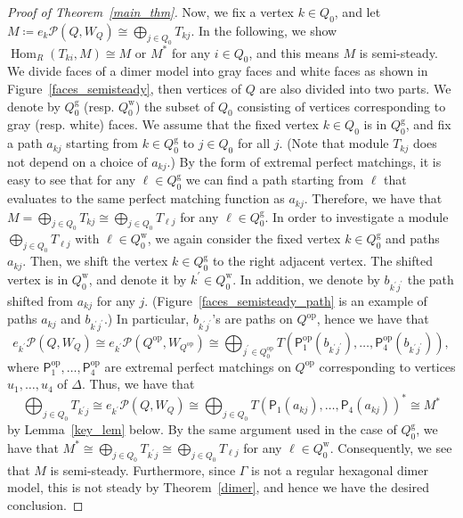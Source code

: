 \documentclass[11pt]{amsart}
\theoremstyle{definition}
\newcommand{\rmg}{\mathrm{g}}
\newcommand{\rmw}{\mathrm{w}}
\newcommand{\calP}{\mathcal{P}}
\newcommand{\sfP}{\mathsf{P}}
\DeclareMathOperator{\op}{op}
\DeclareMathOperator{\Hom}{Hom}
\begin{document}
\begin{proof}[Proof of Theorem~\ref{main_thm}]
Now, we fix a vertex $k\in Q_0$, and let $M\coloneqq e_k\calP(Q, W_Q)\cong\bigoplus_{j\in Q_0}T_{kj}$. In the following, we show $\Hom_R(T_{ki},M)\cong M$ or $M^*$ for any $i\in Q_0$, and this means $M$ is semi-steady. We divide faces of a dimer model into gray faces and white faces as shown in Figure~\ref{faces_semisteady}, then vertices of $Q$ are also divided into two parts. We denote by $Q_0^{\rmg}$ (resp. $Q_0^{\rmw}$) the subset of $Q_0$ consisting of vertices corresponding to gray (resp. white) faces. We assume that the fixed vertex $k\in Q_0$ is in $Q_0^{\rmg}$, and fix a path $a_{kj}$ starting from $k\in Q_0^{\rmg}$ to $j\in Q_0$ for all $j$. (Note that module $T_{kj}$ does not depend on a choice of $a_{kj}$.) By the form of extremal perfect matchings, it is easy to see that for any $\ell\in Q_0^{\rmg}$ we can find a path starting from $\ell$ that evaluates to the same perfect matching function as $a_{kj}$. Therefore, we have that $M=\bigoplus_{j\in Q_0}T_{kj}\cong\bigoplus_{j\in Q_0}T_{\ell j}$ for any $\ell\in Q_0^{\rmg}$. In order to investigate a module $\bigoplus_{j\in Q_0}T_{\ell j}$ with $\ell\in Q_0^{\rmw}$, we again consider the fixed vertex $k\in Q_0^{\rmg}$ and paths $a_{kj}$. Then, we shift the vertex $k\in Q_0^{\rmg}$ to the right adjacent vertex. The shifted vertex is in $Q_0^{\rmw}$, and denote it by $k^\prime\in Q_0^{\rmw}$. In addition, we denote by $b_{k^\prime j^\prime}$ the path shifted from $a_{kj}$ for any $j$. (Figure~\ref{faces_semisteady_path} is an example of paths $a_{kj}$ and $b_{k^\prime j^\prime}$.) In particular, $b_{k^\prime j^\prime}$'s are paths on $Q^{\op}$, hence we have that
\[
e_{k^\prime}\calP(Q,W_Q)\cong e_{k^\prime}\calP(Q^{\op},W_{Q^{\op}})
\cong\bigoplus_{j^\prime\in Q_0^{\op}} T(\sfP^{\op}_1(b_{k^\prime j^\prime}),\dots,\sfP^{\op}_4(b_{k^\prime j^\prime})),
\]
where $\sfP^{\op}_1,\dots,\sfP^{\op}_4$ are extremal perfect matchings on $Q^{\op}$ corresponding to vertices $u_1,\dots,u_4$ of $\Delta$. Thus, we have that
\[
\bigoplus_{j\in Q_0}T_{k^\prime j}\cong e_{k^\prime}\calP(Q,W_Q)\cong\bigoplus_{j\in Q_0}T(\sfP_1(a_{kj}),\dots,\sfP_4(a_{kj}))^*\cong M^*
\]
by Lemma~\ref{key_lem} below. By the same argument used in the case of $Q_0^{\rmg}$, we have that $M^*\cong\bigoplus_{j\in Q_0}T_{k^\prime j}\cong\bigoplus_{j\in Q_0}T_{\ell j}$ for any $\ell\in Q_0^{\rmw}$. Consequently, we see that $M$ is semi-steady. Furthermore, since $\Gamma$ is not a regular hexagonal dimer model, this is not steady by Theorem~\ref{dimer}, and hence we have the desired conclusion.



\end{proof}
\end{document}
